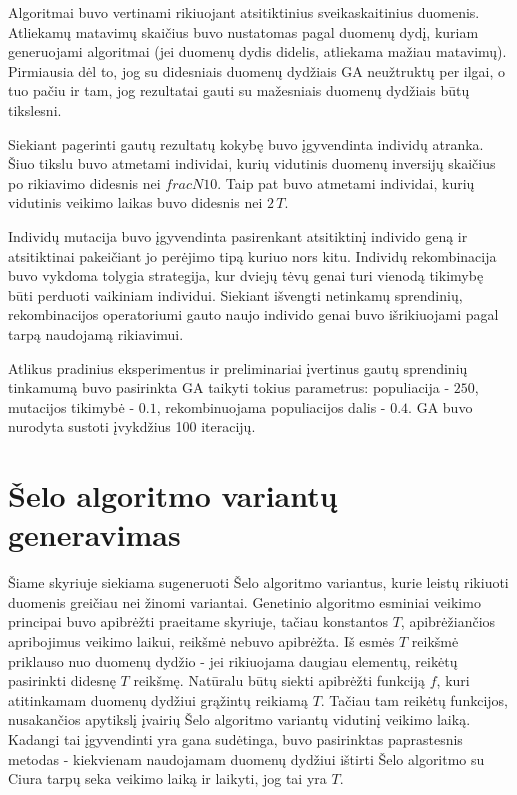 \documentclass{VUMIFInfBakalaurinis}
\begin{document}
Algoritmai buvo vertinami rikiuojant atsitiktinius sveikaskaitinius duomenis.
Atliekamų matavimų skaičius buvo nustatomas pagal duomenų dydį, kuriam generuojami algoritmai (jei duomenų dydis didelis, atliekama mažiau matavimų).
Pirmiausia dėl to, jog su didesniais duomenų dydžiais GA neužtruktų per ilgai, o tuo pačiu ir tam,
jog rezultatai gauti su mažesniais duomenų dydžiais būtų tikslesni.

Siekiant pagerinti gautų rezultatų kokybę buvo įgyvendinta individų atranka.
Šiuo tikslu buvo atmetami individai, kurių vidutinis duomenų inversijų skaičius po rikiavimo didesnis nei $frac{N}{10}$.
Taip pat buvo atmetami individai, kurių vidutinis veikimo laikas buvo didesnis nei $2\,T$.

Individų mutacija buvo įgyvendinta pasirenkant atsitiktinį individo geną ir atsitiktinai pakeičiant jo perėjimo tipą kuriuo nors kitu.
Individų rekombinacija buvo vykdoma tolygia strategija, kur dviejų tėvų genai turi vienodą tikimybę
būti perduoti vaikiniam individui.
Siekiant išvengti netinkamų sprendinių, rekombinacijos operatoriumi gauto naujo individo genai buvo išrikiuojami pagal tarpą naudojamą rikiavimui.

Atlikus pradinius eksperimentus ir preliminariai įvertinus gautų sprendinių tinkamumą buvo pasirinkta GA taikyti tokius parametrus:
populiacija - $250$, mutacijos tikimybė - $0.1$, rekombinuojama populiacijos dalis - $0.4$.
GA buvo nurodyta sustoti įvykdžius 100 iteracijų.

\section{Šelo algoritmo variantų generavimas}

Šiame skyriuje siekiama sugeneruoti Šelo algoritmo variantus,
kurie leistų rikiuoti duomenis greičiau nei žinomi variantai.
Genetinio algoritmo esminiai veikimo principai buvo apibrėžti praeitame skyriuje, tačiau
konstantos $T$, apibrėžiančios apribojimus veikimo laikui, reikšmė nebuvo apibrėžta.
Iš esmės $T$ reikšmė priklauso nuo duomenų dydžio - jei rikiuojama daugiau elementų, reikėtų pasirinkti didesnę $T$ reikšmę.
Natūralu būtų siekti apibrėžti funkciją $f$, kuri atitinkamam duomenų dydžiui grąžintų reikiamą $T$.
Tačiau tam reikėtų funkcijos, nusakančios apytikslį įvairių Šelo algoritmo variantų vidutinį veikimo laiką.
Kadangi tai įgyvendinti yra gana sudėtinga, buvo pasirinktas paprastesnis metodas - kiekvienam naudojamam duomenų dydžiui ištirti
Šelo algoritmo su Ciura tarpų seka veikimo laiką ir laikyti, jog tai yra $T$.
\end{document}
